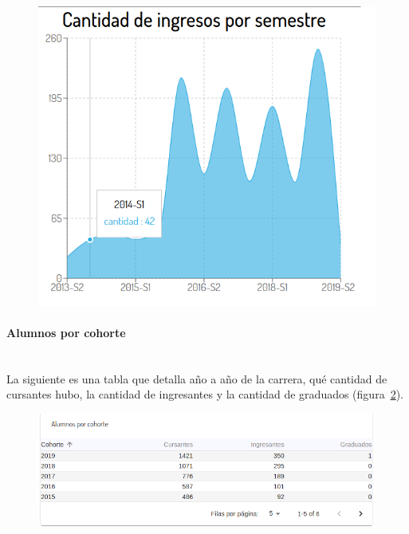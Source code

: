 \begin{figure}[H]
  \centering
    \includegraphics[scale=0.4]{images/seguimiento-academico/sa-ingresossemestre.png}
  \label{fig:sa-ingresos-semestre}
\end{figure}

\paragraph{Alumnos por cohorte} \mbox{}\\
La siguiente es una tabla que detalla año a año de la carrera, qué cantidad de cursantes hubo, la cantidad de ingresantes y la cantidad de graduados  (figura~\ref{fig:sa-alumnos-cohorte}).

\begin{figure}[H]
  \centering
    \includegraphics[scale=0.4]{images/seguimiento-academico/sa-alumnos-cohorte.png}
  \label{fig:sa-alumnos-cohorte}
\end{figure}

